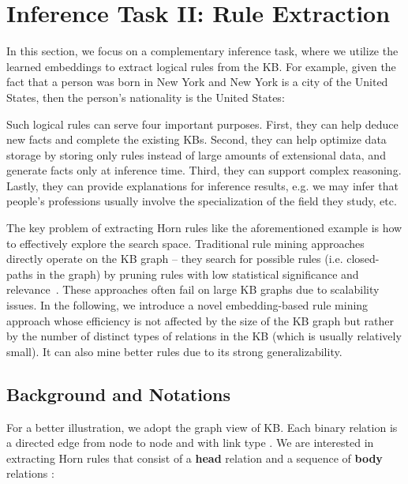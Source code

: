 \documentclass{article} \usepackage{iclr2015,times}
\begin{document}
\section{Inference Task II: Rule Extraction}
\label{sec:rule_extraction}
In this section, we focus on a complementary inference task, where we utilize the learned embeddings to extract logical rules from the KB. For example, given the fact that a person was born in New York and New York is a city of the United States, then the person's nationality is the United States:

Such logical rules can serve four important purposes. First, they can help deduce new facts and complete the existing KBs. Second, they can help optimize data storage by storing only rules instead of large amounts of extensional data, and generate facts only at inference time. Third, they can support complex reasoning. Lastly, they can provide explanations for inference results, e.g. we may infer that people's professions usually involve the specialization of the field they study, etc.

The key problem of extracting Horn rules like the aforementioned example is how to effectively explore the search space. Traditional rule mining approaches directly operate on the KB graph -- they search for possible rules (i.e. closed-paths in the graph) by pruning rules with low statistical significance and relevance~\citep{schoenmackers2010learning}. These approaches often fail on large KB graphs due to scalability issues. In the following, we introduce a novel embedding-based rule mining approach whose efficiency is not affected by the size of the KB graph but rather by the number of distinct types of relations in the KB (which is usually relatively small). It can also mine better rules due to its strong generalizability.

\subsection{Background and Notations} 
For a better illustration, we adopt the graph view of KB. Each binary relation  is a directed edge from node  to node  and with link type . We are interested in extracting Horn rules that consist of a \textbf{head} relation  and a sequence of \textbf{body} relations :
\end{document}
